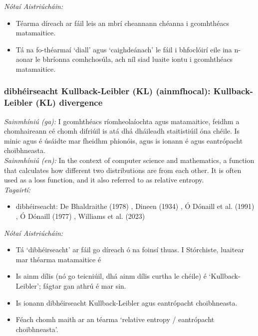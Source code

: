  \noindent \textit{Nótaí Aistriúcháin:}
\begin{itemize}
	\item Téarma díreach ar fáil leis an mbrí cheannann chéanna i gcomhthéacs matamaitice.
	\item Tá na fo-théarmaí `diall' agus `caighdeánach' le fáil i bhfoclóirí eile ina n-aonar le bhríonna comhchosúla, ach níl siad luaite iontu i gcomhthéacs matamaitice.
\end{itemize}


\subsubsection*{dibhéirseacht Kullback-Leibler (KL) (ainmfhocal): Kullback-Leibler (KL) divergence}
 \noindent \textit{Sainmhíniú (ga):} I gcomhthéacs ríomheolaíochta agus matamaitice, feidhm a chomhaireann cé chomh difriúil is atá dhá dháileadh staitistiúil óna chéile. Is minic agus é úsáidte mar fheidhm phionóis, agus is ionann é agus eantrópacht choibhneasta.
\\
 \noindent \textit{Sainmhíniú (en):} In the context of computer science and mathematics, a function that calculates how different two distributions are from each other. It is often used as a loss function, and it also referred to as relative entropy.
\\
 \noindent \textit{Tagairtí:}
\begin{itemize}
	\item dibhéirseacht: De Bhaldraithe (1978) \cite{de-bhaldraithe}, Dineen (1934) \cite{dineen}, Ó Dónaill et al. (1991) \cite{focloir-beag}, Ó Dónaill (1977) \cite{odonaill}, Williams et al. (2023) \cite{storchiste}
\end{itemize}

 \noindent \textit{Nótaí Aistriúcháin:}
\begin{itemize}
	\item Tá `dibhéirseacht' ar fáil go díreach ó na foinsí thuas. I Stórchiste, luaitear mar théarma matamaitice é
	\item Is ainm dílis (nó go teicniúil, dhá ainm dílis curtha le chéile) é `Kullback-Leibler'; fágtar gan athrú é mar sin.
	\item Is ionann dibhéirseacht Kullback-Leibler agus eantrópacht choibhneasta.
	\item Féach chomh maith ar an téarma `relative entropy / eantrópacht choibhneasta'.
\end{itemize}


